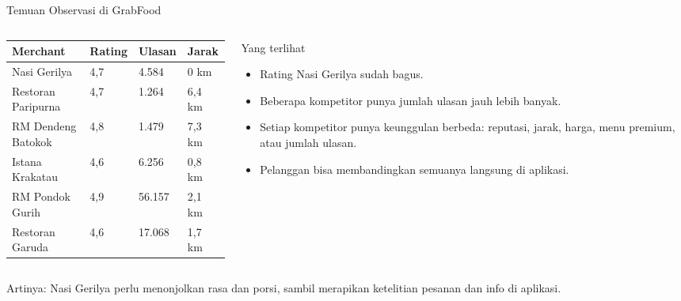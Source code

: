 \documentclass[aspectratio=169,11pt]{beamer}
\begin{document}
\begin{frame}{Temuan Observasi di GrabFood}
\small
\begin{columns}[T,onlytextwidth]
    \begin{column}{0.57\textwidth}
        \setlength{\tabcolsep}{2.5pt}
        \begin{tabularx}{\linewidth}{@{}Y C{0.85cm} C{1.25cm} C{1.25cm}@{}}
        \toprule
        \textbf{Merchant} & \textbf{Rating} & \textbf{Ulasan} & \textbf{Jarak} \\
        \midrule
        Nasi Gerilya & 4,7 & 4.584 & 0 km \\
        Restoran Paripurna & 4,7 & 1.264 & 6,4 km \\
        RM Dendeng Batokok & 4,8 & 1.479 & 7,3 km \\
        Istana Krakatau & 4,6 & 6.256 & 0,8 km \\
        RM Pondok Gurih & 4,9 & 56.157 & 2,1 km \\
        Restoran Garuda & 4,6 & 17.068 & 1,7 km \\
        \bottomrule
        \end{tabularx}
    \end{column}
    \begin{column}{0.40\textwidth}
        \begin{block}{Yang terlihat}
        \begin{itemize}
            \item Rating Nasi Gerilya sudah bagus.
            \item Beberapa kompetitor punya jumlah ulasan jauh lebih banyak.
            \item Setiap kompetitor punya keunggulan berbeda: reputasi, jarak, harga, menu premium, atau jumlah ulasan.
            \item Pelanggan bisa membandingkan semuanya langsung di aplikasi.
        \end{itemize}
        \end{block}
    \end{column}
\end{columns}
\vspace{0.15cm}
\alert{Artinya:} Nasi Gerilya perlu menonjolkan rasa dan porsi, sambil merapikan ketelitian pesanan dan info di aplikasi.
\end{frame}
\end{document}
